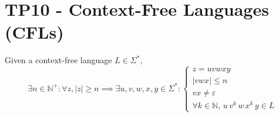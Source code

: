 \setcounter{section}{9}
\section{TP10 - Context-Free Languages (CFLs)}
{
\renewcommand{\thesubsubsection}{\thesubsection\alph{subsubsection}}
\begin{lemma} \label{lem:pumpCFL}
Given a context-free language $L \in \Sigma^*$,
\begin{equation*}
	\exists n \in \mathbb{N}^+ \colon \forall z, |z|\geq n \implies \exists u, v, w, x, y \in \Sigma^* \colon 
	\begin{cases}
		z=uvwxy\\
		|vwx| \leq n\\
		vx \neq \varepsilon \\
		\forall k \in \mathbb{N},\,u\,v^k\,w\,x^k\,y \in L
	\end{cases}
\end{equation*} 
\end{lemma}
}
